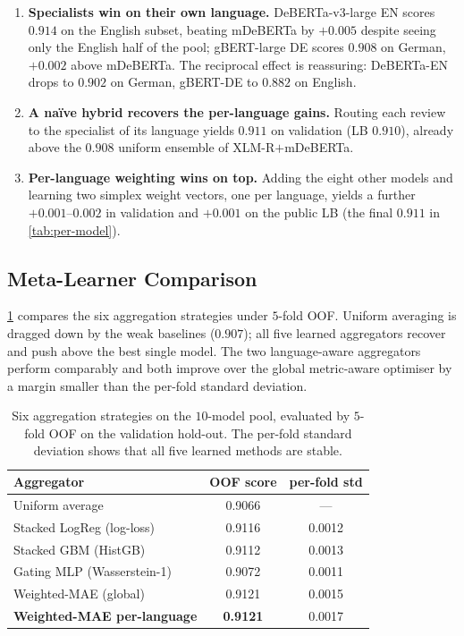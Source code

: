 \documentclass{article}
\theoremstyle{plain}
\begin{document}
\begin{enumerate}[leftmargin=*,topsep=2pt,itemsep=0pt]
\item \textbf{Specialists win on their own language.}
DeBERTa-v3-large EN scores $0.914$ on the English subset, beating
mDeBERTa by $+0.005$ despite seeing only the English half of the pool;
gBERT-large DE scores $0.908$ on German, $+0.002$ above mDeBERTa. The
reciprocal effect is reassuring: DeBERTa-EN drops to $0.902$ on
German, gBERT-DE to $0.882$ on English.
\item \textbf{A naïve hybrid recovers the per-language gains.}
Routing each review to the specialist of its language yields $0.911$
on validation (LB $0.910$), already above the $0.908$ uniform ensemble
of XLM-R$+$mDeBERTa.
\item \textbf{Per-language weighting wins on top.}
Adding the eight other models and learning two simplex weight vectors,
one per language, yields a further $+0.001$--$0.002$ in validation and
$+0.001$ on the public LB (the final $0.911$ in \cref{tab:per-model}).
\end{enumerate}

\subsection{Meta-Learner Comparison}
\label{sec:meta-comparison}

\cref{tab:meta} compares the six aggregation strategies under $5$-fold
OOF. Uniform averaging is dragged down by the weak baselines
($0.907$); all five learned aggregators recover and push above the
best single model. The two language-aware aggregators perform
comparably and both improve over the global metric-aware optimiser by
a margin smaller than the per-fold standard deviation.

\begin{table}[t]
\caption{Six aggregation strategies on the $10$-model pool, evaluated by
$5$-fold OOF on the validation hold-out. The per-fold standard deviation
shows that all five learned methods are stable.}
\label{tab:meta}
\vskip 0.06in
\begin{center}\begin{small}\begin{tabular}{lcc}
\toprule
Aggregator & OOF score & per-fold std \\
\midrule
Uniform average                       & 0.9066 & --- \\
Stacked LogReg (log-loss)             & 0.9116 & 0.0012 \\
Stacked GBM (HistGB)                  & 0.9112 & 0.0013 \\
Gating MLP (Wasserstein-1)            & 0.9072 & 0.0011 \\
Weighted-MAE (global)                 & 0.9121 & 0.0015 \\
\textbf{Weighted-MAE per-language}    & \textbf{0.9121} & 0.0017 \\
\bottomrule
\end{tabular}\end{small}\end{center}
\vskip -0.18in
\end{table}
\end{document}
